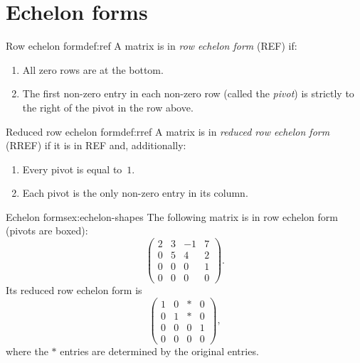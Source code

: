 \section{Echelon forms}\label{sec:echelon}

\begin{definition}{Row echelon form}{def:ref}
A matrix is in \emph{row echelon form} (REF) if:
\begin{enumerate}[label=(\roman*)]
  \item All zero rows are at the bottom.
  \item The first non-zero entry in each non-zero row (called the
    \emph{pivot}) is strictly to the right of the pivot
    in the row above.
\end{enumerate}
\end{definition}

\begin{definition}{Reduced row echelon form}{def:rref}
A matrix is in \emph{reduced row echelon form} (RREF) if it is in REF
and, additionally:
\begin{enumerate}[label=(\roman*),resume]
  \item Every pivot is equal to~$1$.
  \item Each pivot is the only non-zero entry in its column.
\end{enumerate}
\end{definition}

\begin{example}{Echelon forms}{ex:echelon-shapes}
The following matrix is in row echelon form (pivots are boxed):
\[
  \begin{pmatrix}
    \boxed{2} & 3 & -1 & 7\\
    0 & \boxed{5} & 4 & 2\\
    0 & 0 & 0 & \boxed{1}\\
    0 & 0 & 0 & 0
  \end{pmatrix}.
\]
Its reduced row echelon form is
\[
  \begin{pmatrix}
    \boxed{1} & 0 & * & 0\\
    0 & \boxed{1} & * & 0\\
    0 & 0 & 0 & \boxed{1}\\
    0 & 0 & 0 & 0
  \end{pmatrix},
\]
where the $*$ entries are determined by the original entries.
\end{example}

